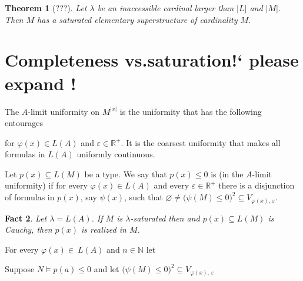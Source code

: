 \documentclass[12pt,letterpaper,oneside,reqno]{amsart}
\theoremstyle{plain}
\newtheorem{theorem}{Theorem}%
\newtheorem{fact}[theorem]{Fact}
\theoremstyle{remark}
\renewcommand*{\emph}[1]{%
   \smash{\tikz[baseline]\node[rectangle, fill=olive!25, rounded corners, inner xsep=0.5ex, inner ysep=0.2ex, anchor=base, minimum height = 2.7ex]{#1};}}
\begin{document}
\begin{theorem}[???]
  Let $\lambda$ be an inaccessible cardinal larger than $|L|$ and $|M|$.
  Then $M$ has a saturated elementary superstructure of cardinality $M$. 
\end{theorem}


\section{Completeness vs.\@ saturation\quad !` please expand !}


The $A$-limit uniformity on $M^{|x|}$ is the uniformity that has the following entourages 


for $\varphi(x)\in L(A)$ and $\varepsilon\in{\mathds R}^+$. It is the coarsest uniformity that makes all formulas in $L(A)$ uniformly continuous.

Let $p(x)\subseteq L(M)$ be a type.
We say that $p(x)\le0$ is \emph{Cauchy\/} (in the $A$-limit uniformity) if for every $\varphi(x)\in L(A)$ and every $\varepsilon\in{\mathds R}^+$ there is a disjunction of formulas in $p(x)$, say $\psi(x)$, such that $\varnothing\neq\big(\psi(M)\le0\big)^2\subseteq V_{\varphi(x),\, \varepsilon}$.

\begin{fact}
  Let $\lambda=L(A)$.
  If $M$ is $\lambda$-saturated then and $p(x)\subseteq L(M)$ is Cauchy, then $p(x)$ is realized in $M$.
\end{fact}


For every $\varphi(x)\in\ L(A)$ and $n\in{\mathds N}$ let 


Suppose $N\models p(a)\le0$ and let $\big(\psi(M)\le0\big)^2\subseteq V_{\varphi(x),\, \varepsilon}$
\end{document}
